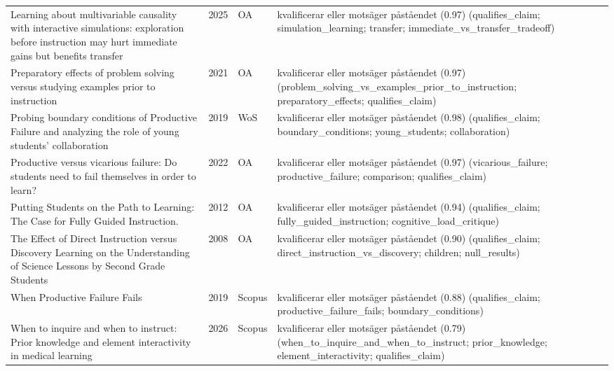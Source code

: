 \begin{longtable}{@{}%
  >{\raggedright\arraybackslash}p{}c%
  >{\raggedright\arraybackslash}p{}%
  >{\raggedright\arraybackslash\footnotesize}p{}@{}}
Learning about multivariable causality with interactive simulations: exploration before instruction may hurt immediate gains but benefits transfer & 2025 & OA & kvalificerar eller motsäger påståendet (0.97) (qualifies\_\allowbreak{}claim; simulation\_\allowbreak{}learning; transfer; immediate\_\allowbreak{}vs\_\allowbreak{}transfer\_\allowbreak{}tradeoff) \\
Preparatory effects of problem solving versus studying examples prior to instruction & 2021 & OA & kvalificerar eller motsäger påståendet (0.97) (problem\_\allowbreak{}solving\_\allowbreak{}vs\_\allowbreak{}examples\_\allowbreak{}prior\_\allowbreak{}to\_\allowbreak{}instruction; preparatory\_\allowbreak{}effects; qualifies\_\allowbreak{}claim) \\
Probing boundary conditions of Productive Failure and analyzing the role of young students' collaboration & 2019 & WoS & kvalificerar eller motsäger påståendet (0.98) (qualifies\_\allowbreak{}claim; boundary\_\allowbreak{}conditions; young\_\allowbreak{}students; collaboration) \\
Productive versus vicarious failure: Do students need to fail themselves in order to learn? & 2022 & OA & kvalificerar eller motsäger påståendet (0.97) (vicarious\_\allowbreak{}failure; productive\_\allowbreak{}failure; comparison; qualifies\_\allowbreak{}claim) \\
Putting Students on the Path to Learning: The Case for Fully Guided Instruction. & 2012 & OA & kvalificerar eller motsäger påståendet (0.94) (qualifies\_\allowbreak{}claim; fully\_\allowbreak{}guided\_\allowbreak{}instruction; cognitive\_\allowbreak{}load\_\allowbreak{}critique) \\
The Effect of Direct Instruction versus Discovery Learning on the Understanding of Science Lessons by Second Grade Students & 2008 & OA & kvalificerar eller motsäger påståendet (0.90) (qualifies\_\allowbreak{}claim; direct\_\allowbreak{}instruction\_\allowbreak{}vs\_\allowbreak{}discovery; children; null\_\allowbreak{}results) \\
When Productive Failure Fails & 2019 & Scopus & kvalificerar eller motsäger påståendet (0.88) (qualifies\_\allowbreak{}claim; productive\_\allowbreak{}failure\_\allowbreak{}fails; boundary\_\allowbreak{}conditions) \\
When to inquire and when to instruct: Prior knowledge and element interactivity in medical learning & 2026 & Scopus & kvalificerar eller motsäger påståendet (0.79) (when\_\allowbreak{}to\_\allowbreak{}inquire\_\allowbreak{}and\_\allowbreak{}when\_\allowbreak{}to\_\allowbreak{}instruct; prior\_\allowbreak{}knowledge; element\_\allowbreak{}interactivity; qualifies\_\allowbreak{}claim) \\
\end{longtable}
\endgroup

